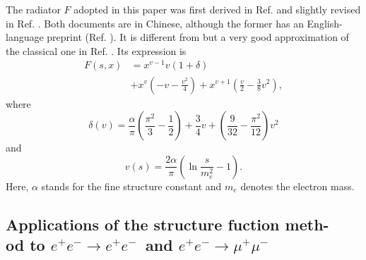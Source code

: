 \documentclass[a4paper,10pt,twoside]{cpc-hepnp}
\newcommand{\eetoee}{$e^+e^- \to e^+e^-$~}
\newcommand{\eetomumu}{$e^+e^- \to \mu^+\mu^-$~}
\begin{document}
\begin{CJK*}{UTF8}{gbsn}
\begin{multicols}{2}
The radiator $F$ adopted in this paper was first derived in Ref. \cite{Radiator 1} and slightly revised in Ref. \cite{Radiator 2}. Both documents are in Chinese, although the former has an English-language preprint (Ref. \cite{Radiator 3}). It is different from but a very good approximation of the classical one in Ref. \cite{STRUCTUREFUNCTIONMETHOD}. Its expression is
\begin{align}
	F(s,x) & = x^{v-1}v(1+\delta) \nonumber \\
	& + x^{v}\left(-v-\frac{v^2}{4}\right) + x^{v+1}\left(\frac{v}{2}-\frac{3}{8}v^2\right),
	\label{Equation: Expression of radiator.}
\end{align}
where
\begin{equation}
	\delta(v) = \frac{\alpha}{\pi}(\frac{\pi^2}{3}-\frac{1}{2})+\frac{3}{4}v+\left(\frac{9}{32}-\frac{\pi^2}{12}\right)v^2
\end{equation}
and
\begin{equation}
	v(s) = \frac{2\alpha}{\pi}\left(\ln\frac{s}{m_e^2}-1\right).
\end{equation}
Here, $\alpha$ stands for the fine structure constant and $m_e$ denotes the electron mass.

\subsection{Applications of the structure fuction meth-\\od to \eetoee and \eetomumu}
\label{Subsection: Applications of the structure fuction method to eetoee and eetomumu}


\end{multicols}
\end{CJK*}
\end{document}
